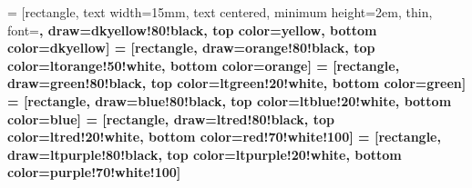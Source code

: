 

 = [rectangle, 
                    text width=15mm,
                    text centered,
                    minimum height=2em,
                    thin,
                    font=\bfseries,
                    draw=dkyellow!80!black,
                    top color=yellow,
                    bottom color=dkyellow]
 = [rectangle, 
                      draw=orange!80!black,
                      top color=ltorange!50!white,
                      bottom color=orange]
 = [rectangle, 
                      draw=green!80!black,
                      top color=ltgreen!20!white,
                      bottom color=green]
 = [rectangle, 
                      draw=blue!80!black,
                      top color=ltblue!20!white,
                      bottom color=blue]
 = [rectangle, 
                      draw=ltred!80!black,
                      top color=ltred!20!white,
                      bottom color=red!70!white!100]
 = [rectangle, 
                      draw=ltpurple!80!black,
                      top color=ltpurple!20!white,
                      bottom color=purple!70!white!100]

